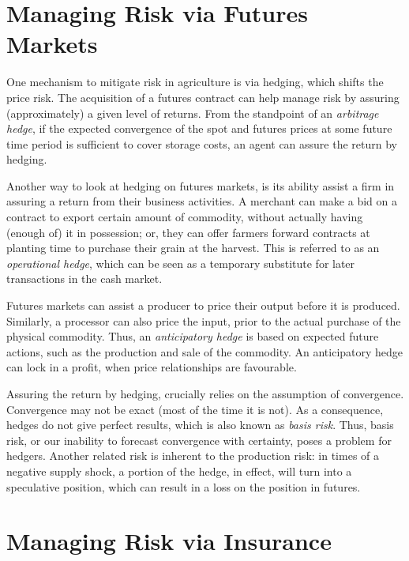 \documentclass[
]{book}
\begin{document}
\hypertarget{managing-risk-via-futures-markets}{%
\section{Managing Risk via Futures Markets}\label{managing-risk-via-futures-markets}}

One mechanism to mitigate risk in agriculture is via hedging, which shifts the price risk. The acquisition of a futures contract can help manage risk by assuring (approximately) a given level of returns. From the standpoint of an \emph{arbitrage hedge}, if the expected convergence of the spot and futures prices at some future time period is sufficient to cover storage costs, an agent can assure the return by hedging.

Another way to look at hedging on futures markets, is its ability assist a firm in assuring a return from their business activities. A merchant can make a bid on a contract to export certain amount of commodity, without actually having (enough of) it in possession; or, they can offer farmers forward contracts at planting time to purchase their grain at the harvest. This is referred to as an \emph{operational hedge}, which can be seen as a temporary substitute for later transactions in the cash market.

Futures markets can assist a producer to price their output before it is produced. Similarly, a processor can also price the input, prior to the actual purchase of the physical commodity. Thus, an \emph{anticipatory hedge} is based on expected future actions, such as the production and sale of the commodity. An anticipatory hedge can lock in a profit, when price relationships are favourable.

Assuring the return by hedging, crucially relies on the assumption of convergence. Convergence may not be exact (most of the time it is not). As a consequence, hedges do not give perfect results, which is also known as \emph{basis risk}. Thus, basis risk, or our inability to forecast convergence with certainty, poses a problem for hedgers. Another related risk is inherent to the production risk: in times of a negative supply shock, a portion of the hedge, in effect, will turn into a speculative position, which can result in a loss on the position in futures.

\hypertarget{managing-risk-via-insurance}{%
\section{Managing Risk via Insurance}\label{managing-risk-via-insurance}}
\end{document}
